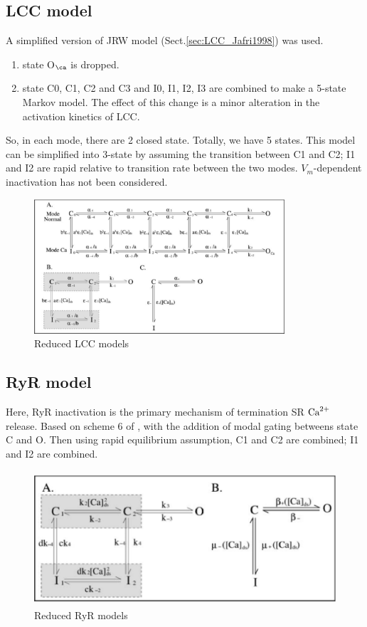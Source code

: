 \subsection{LCC model}

A simplified version of JRW model \citep{jafri1998cad}
(Sect.\ref{sec:LCC_Jafri1998}) was used.
\begin{enumerate}
  \item state O$_\ca$ is dropped. 
  \item state C0, C1, C2 and C3 and I0, I1, I2, I3 are combined to make a
  5-state Markov model. The effect of this change is a minor alteration in the
  activation kinetics of LCC.
\end{enumerate}
So, in each mode, there are 2 closed state. Totally, we have 5 states.
This model can be simplified into 3-state by assuming the transition between C1
and C2; I1 and I2 are rapid relative to transition rate between the two modes. 
$V_m$-dependent inactivation has not been considered.

\begin{figure}[hbt]
  \centerline{\includegraphics[height=5cm,
    angle=0]{./images/greenstein_LCC_06.eps}}
\caption{Reduced LCC models}
\label{fig:greenstein_LCC_06}
\end{figure}

\subsection{RyR model}

Here, RyR inactivation is the primary mechanism of termination SR ${\text{Ca}^{2+}}$ release.
Based on scheme 6 of \citep{stern1999lcm}, with the addition of modal gating
betweens state C and O. Then using rapid equilibrium assumption, C1 and C2 are
combined; I1 and I2 are combined. 

\begin{figure}[hbt]
  \centerline{\includegraphics[height=5cm,
    angle=0]{./images/greenstein_RyR_06.eps}}
\caption{Reduced RyR models}
\label{fig:greenstein_RyR_06}
\end{figure}

